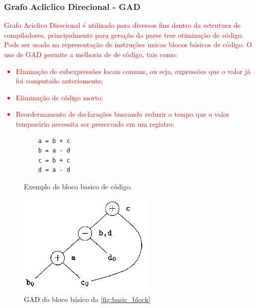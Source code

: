 \subsubsection{Grafo Acliclico Direcional - GAD}
\par
\textcolor{red}{Grafo Aciclico Direcional é utilizado para diversos fins dentro da estrutura de compiladores, principalmente para geração da parse tree otimização de código. Pode ser usado na representação de instruções unicas blocos básicos de código\cite{aho2007compilers}. O uso de GAD permite a melhoria de de código, tais como:
\begin{itemize}
\item Elminação de subexpressões locais comuns, ou seja, expressões que o valor já foi computado anteriomente;
\item Eliminação de código morto;
\item  Reordernamento de declarações buscando reduzir o tempo que o valor temporário necessita ser preservado em um registro;
\end{itemize}}

\par
\begin{figure}[thp]
\caption{\label{fig:basic_block} Exemplo de bloco basico de código.}
	\begin{center}
    \begin{minipage}{0.9\textwidth}
    \begin{lstlisting}
    a = b + c
    b = a - d
    c = b + c
    d = a - d
	\end{lstlisting}
    \end{minipage}
	\end{center}
\end{figure}

\begin{figure}[htb]
	\begin{center}
    \caption{\label{fig:gda}GAD do bloco básico da \autoref{fig:basic_block}}
	\includegraphics[scale=0.40]{Figuras/GDA.png}
	\end{center}
\end{figure}

